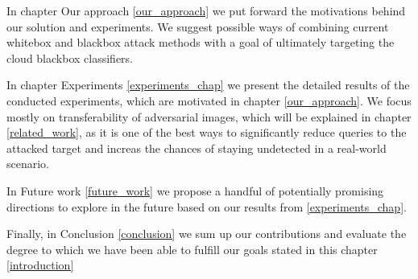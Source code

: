 In chapter Our approach \ref{our_approach} we put forward the motivations behind our solution and experiments. We suggest possible ways of combining current whitebox and blackbox attack methods with a goal of ultimately targeting the cloud blackbox classifiers.

In chapter Experiments \ref{experiments_chap} we present the detailed results of the conducted experiments, which are motivated in chapter \ref{our_approach}. We focus mostly on transferability of adversarial images, which will be explained in chapter \ref{related_work}, as it is one of the best ways to significantly reduce queries to the attacked target and increas the chances of staying undetected in a real-world scenario.

In Future work \ref{future_work} we propose a handful of potentially promising directions to explore in the future based on our results from \ref{experiments_chap}.

Finally, in Conclusion \ref{conclusion} we sum up our contributions and evaluate the degree to which we have been able to fulfill our goals stated in this chapter \ref{introduction}